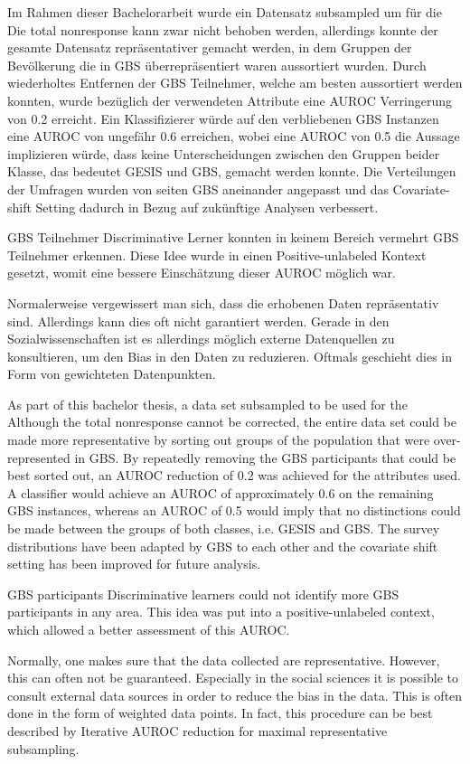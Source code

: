Im Rahmen dieser Bachelorarbeit wurde ein Datensatz subsampled um für die
Die total nonresponse kann zwar nicht behoben werden, allerdings konnte der gesamte Datensatz repräsentativer gemacht werden, in dem Gruppen der Bevölkerung die in GBS überrepräsentiert waren aussortiert wurden. Durch wiederholtes Entfernen der GBS Teilnehmer, welche am besten aussortiert werden konnten, wurde bezüglich der verwendeten Attribute eine AUROC Verringerung von 0.2 erreicht. Ein Klassifizierer würde auf den verbliebenen GBS Instanzen eine AUROC von ungefähr 0.6 erreichen, wobei eine AUROC von 0.5 die Aussage implizieren würde, dass keine Unterscheidungen zwischen den Gruppen beider Klasse, das bedeutet GESIS und GBS, gemacht werden konnte. 
Die Verteilungen der Umfragen wurden von seiten GBS aneinander angepasst und das Covariate-shift Setting dadurch in Bezug auf zukünftige Analysen verbessert.

GBS Teilnehmer Discriminative Lerner konnten in keinem Bereich vermehrt GBS Teilnehmer erkennen. Diese Idee wurde in einen Positive-unlabeled Kontext gesetzt, womit eine bessere Einschätzung dieser AUROC möglich war. 

Normalerweise vergewissert man sich, dass die erhobenen Daten repräsentativ sind. Allerdings kann dies oft nicht garantiert werden. Gerade in den Sozialwissenschaften ist es allerdings möglich externe Datenquellen zu konsultieren, um den Bias in den Daten zu reduzieren. Oftmals geschieht dies in Form von gewichteten Datenpunkten. 

As part of this bachelor thesis, a data set subsampled to be used for the
Although the total nonresponse cannot be corrected, the entire data set could be made more representative by sorting out groups of the population that were over-represented in GBS. By repeatedly removing the GBS participants that could be best sorted out, an AUROC reduction of 0.2 was achieved for the attributes used. A classifier would achieve an AUROC of approximately 0.6 on the remaining GBS instances, whereas an AUROC of 0.5 would imply that no distinctions could be made between the groups of both classes, i.e. GESIS and GBS. 
The survey distributions have been adapted by GBS to each other and the covariate shift setting has been improved for future analysis.

GBS participants Discriminative learners could not identify more GBS participants in any area. This idea was put into a positive-unlabeled context, which allowed a better assessment of this AUROC. 

Normally, one makes sure that the data collected are representative. However, this can often not be guaranteed. Especially in the social sciences it is possible to consult external data sources in order to reduce the bias in the data. This is often done in the form of weighted data points. 
In fact, this procedure can be best described by Iterative AUROC reduction for maximal representative subsampling.
